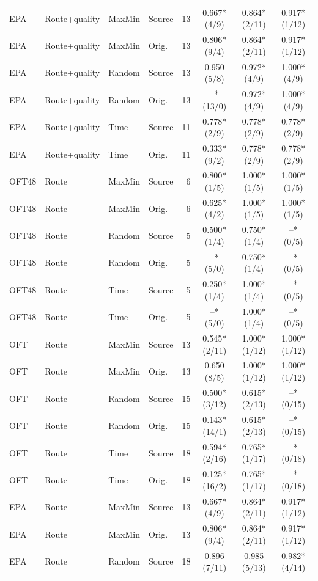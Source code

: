 \begin{longtable}{llllrccc}
EPA & Route+quality & MaxMin & Source & 13 & 0.667* (4/9) & 0.864* (2/11) & 0.917* (1/12) \\
EPA & Route+quality & MaxMin & Orig. & 13 & 0.806* (9/4) & 0.864* (2/11) & 0.917* (1/12) \\
EPA & Route+quality & Random & Source & 13 & 0.950 (5/8) & 0.972* (4/9) & 1.000* (4/9) \\
EPA & Route+quality & Random & Orig. & 13 & --* (13/0) & 0.972* (4/9) & 1.000* (4/9) \\
EPA & Route+quality & Time & Source & 11 & 0.778* (2/9) & 0.778* (2/9) & 0.778* (2/9) \\
EPA & Route+quality & Time & Orig. & 11 & 0.333* (9/2) & 0.778* (2/9) & 0.778* (2/9) \\
OFT48 & Route & MaxMin & Source & 6 & 0.800* (1/5) & 1.000* (1/5) & 1.000* (1/5) \\
OFT48 & Route & MaxMin & Orig. & 6 & 0.625* (4/2) & 1.000* (1/5) & 1.000* (1/5) \\
OFT48 & Route & Random & Source & 5 & 0.500* (1/4) & 0.750* (1/4) & --* (0/5) \\
OFT48 & Route & Random & Orig. & 5 & --* (5/0) & 0.750* (1/4) & --* (0/5) \\
OFT48 & Route & Time & Source & 5 & 0.250* (1/4) & 1.000* (1/4) & --* (0/5) \\
OFT48 & Route & Time & Orig. & 5 & --* (5/0) & 1.000* (1/4) & --* (0/5) \\
OFT & Route & MaxMin & Source & 13 & 0.545* (2/11) & 1.000* (1/12) & 1.000* (1/12) \\
OFT & Route & MaxMin & Orig. & 13 & 0.650 (8/5) & 1.000* (1/12) & 1.000* (1/12) \\
OFT & Route & Random & Source & 15 & 0.500* (3/12) & 0.615* (2/13) & --* (0/15) \\
OFT & Route & Random & Orig. & 15 & 0.143* (14/1) & 0.615* (2/13) & --* (0/15) \\
OFT & Route & Time & Source & 18 & 0.594* (2/16) & 0.765* (1/17) & --* (0/18) \\
OFT & Route & Time & Orig. & 18 & 0.125* (16/2) & 0.765* (1/17) & --* (0/18) \\
EPA & Route & MaxMin & Source & 13 & 0.667* (4/9) & 0.864* (2/11) & 0.917* (1/12) \\
EPA & Route & MaxMin & Orig. & 13 & 0.806* (9/4) & 0.864* (2/11) & 0.917* (1/12) \\
EPA & Route & Random & Source & 18 & 0.896 (7/11) & 0.985 (5/13) & 0.982* (4/14) \\

\end{longtable}
